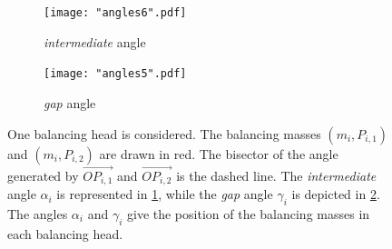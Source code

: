 \documentclass{aims}
\theoremstyle{definition}
\begin{document}
	\begin{figure}
		\centering
		\begin{subfigure}{.6\textwidth}
			\centering
			\texttt{[image: "angles6".pdf]}
			\caption{\textit{intermediate} angle}
			\label{fig:sub1}
		\end{subfigure}%
		\begin{subfigure}{.6\textwidth}
			\centering
			\texttt{[image: "angles5".pdf]}
			\caption{\textit{gap} angle}
			\label{fig:sub2}
		\end{subfigure}
		\caption{One balancing head is considered. The balancing masses $(m_i,P_{i,1})$ and $(m_i,P_{i,2})$ are drawn in red. The bisector of the angle generated by $\overset{\longrightarrow}{OP_{i,1}}$ and $\overset{\longrightarrow}{OP_{i,2}}$ is the dashed line. The \textit{intermediate} angle $\alpha_i$ is represented in \ref{fig:sub1}, while the \textit{gap} angle $\gamma_i$ is depicted in \ref{fig:sub2}. The angles $\alpha_i$ and $\gamma_i$ give the position of the balancing masses in each balancing head.}\label{angle_grah_1}
	\end{figure}
	
\end{document}
